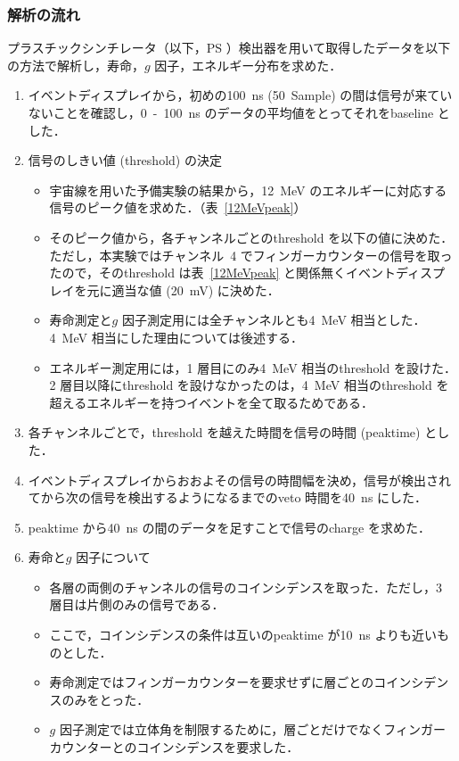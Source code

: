 \subsubsection{解析の流れ}
プラスチックシンチレータ（以下，PS ）検出器を用いて取得したデータを以下の方法で解析し，寿命，$g$ 因子，エネルギー分布を求めた．
\begin{enumerate}
\item イベントディスプレイから，初めの100~ns (50~Sample) の間は信号が来ていないことを確認し，0~-~100~ns のデータの平均値をとってそれをbaseline とした．
\item 信号のしきい値 (threshold) の決定
\begin{itemize}
\item 宇宙線を用いた予備実験の結果から，12~MeV のエネルギーに対応する信号のピーク値を求めた．（表~\ref{12MeVpeak}）%
\item そのピーク値から，各チャンネルごとのthreshold を以下の値に決めた．ただし，本実験ではチャンネル~4 でフィンガーカウンターの信号を取ったので，そのthreshold は表~\ref{12MeVpeak} と関係無くイベントディスプレイを元に適当な値 (20~mV) に決めた．
\item 寿命測定と$g$ 因子測定用には全チャンネルとも4~MeV 相当とした．4~MeV 相当にした理由については後述する．
\item エネルギー測定用には，1 層目にのみ4~MeV 相当のthreshold を設けた．2 層目以降にthreshold を設けなかったのは，4~MeV 相当のthreshold を超えるエネルギーを持つイベントを全て取るためである．
\end{itemize}
\item 各チャンネルごとで，threshold を越えた時間を信号の時間 (peaktime) とした．
\item イベントディスプレイからおおよその信号の時間幅を決め，信号が検出されてから次の信号を検出するようになるまでのveto 時間を40~ns にした．
\item peaktime から40~ns の間のデータを足すことで信号のcharge を求めた．
\item 寿命と$g$ 因子について
\begin{itemize}
\item 各層の両側のチャンネルの信号のコインシデンスを取った．ただし，3 層目は片側のみの信号である．
\item ここで，コインシデンスの条件は互いのpeaktime が10~ns よりも近いものとした．
\item 寿命測定ではフィンガーカウンターを要求せずに層ごとのコインシデンスのみをとった．
\item $g$ 因子測定では立体角を制限するために，層ごとだけでなくフィンガーカウンターとのコインシデンスを要求した．

\end{itemize}
\end{enumerate}
